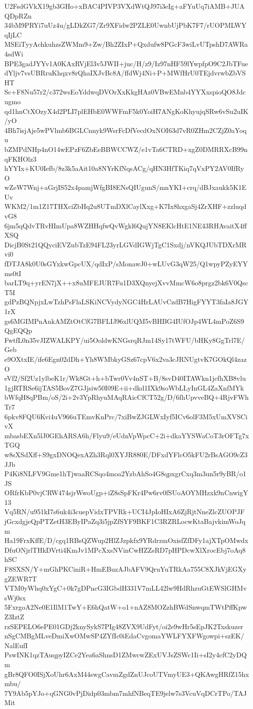 U2FsdGVkX19gb3GHo+xBAC4PIVP3VXdWtQJ97i3eIg+aFYuUq7iAMB+JUAQDpRZn
34bM9PRYi7uUz4u/gLDkZG7/Zr9XFidw2PZLE0UwnbUjPbK7F7/rUOPMLWYqIjLC
MSEiTyyAchkuhzsZWMm9+Zw/Bh2ZIxP+Qxdufw8PGcF3wiLvUTpshD7AWRa4sdWi
BPE3gadJYYv1A0KAxRVjEl3v5JWII+juc/H/z9/Iz97nHF59lYwpfpO9C2JbTFue
dYljv7vsUBRruKhqxv8rQhaIXJvBc8A/ffdWj4Ni+P+MWfHrU0TEjdvrwbZbVSHT
Sc+F8Nu57r2/c372wsEoYddwqDVOrXxKkgHAz0VBwEMnb4YYXxspioQO8Jdcugmo
qd1hnCtXOzyX4d2PLI7plEHbE0WWFmF5k0YoiH7ANgKoKhyujqSRw6vSu2uIK/yO
4Bh7isjAje5wPVlmb6BGLCnnyk9WsrFcDfVecdOxNOI63d7vR0ZHm2CZjZ0aYoqu
bZMPdNHp4nO14wEPzF6ZbEeBBWCCWZ/e1vTa6CTRD+xgZ0DMRRXcB99nqFKHOlz3
hYYIx+KU0Iefb/8z3k5aAit10a8NYrKfNqsACg/qHN3HfTKiq7qVxPY2AV0IfRyO
wZeW7Wnj+aGrjIS52x4pamjWfgBI8ENsQIUgunS/mnYKI+crq/dBJxaukk5K1EUv
WKM2/1m1Z17THXciZbHq2u8UTmDXlCaylXxg+K7Ix8hxgaSj4ZrXHF+zzluqdvG8
6jm5qQdvTRvHImUpa8WZHHqfwQvWgkl6QujYN8EKlcHtE1NE43RHAvaitX4ffXSQ
DicjB0St21QQyciEVZubTzE94FL23yrLGVdIGWjTgC1Sxdj/nVKQJUbTDXrMRvi0
fDTJA8k0U0sGYxkwGpcUX/qdIxP/sMonawJ0+wLUvG3qW25/Q1wpyPZyEYYms0tI
barLT9q+yrEN7jX++x8uMFEJUR7Fu1D3XQnyejXvvMmcW6o8prgz2bk6V0QscT5I
gdPzBQNpjxLwTzhPsFlaLSKiNCVydyNGC4HrLAUvCzdB7HigFYYT3faIa8JGY1rX
gs6MGIMPnAnkAMZtOtCfG7BFLIJ96xlUQM5vBHBG4IUfOJp4WL4mPoZ6S9QgEQQp
FwtfL0n35vJIZWALKPY/ui5OoldwKNGsrqRJm14Sy17tWFU/bHKy8GgTrl7E/Geb
e9OXtxIE/ife6Egn02dDh+Yh8WMbkyGSz67cpV6x2va3cJRNUgtvK7GOkQl4zazO
eVf2/Sf2Uz1ylbeK1r/Wk8Gt+h+bTwr0Vv4nST+B/8svD40ITAWkn1jcfhXB8vlu
1gjRTRSe6ijTAS5BovZ7GJjsiw50I09E+ii+dkd1IXk9soWbLLyInGL4ZaXnfMYk
bWfqH8qPBm/oS/2i+2v3YpRhyuMAqRAicCfCT52g/D/6fhUpvveBQ+4RjvFWhTr7
6pkv8FQU6Kvi4uV966uTEmvKnPrc/7xiBwZJGLWxIyf5ICv6olF3M5xUmXVSCivX
mbasbEXn5lJ0GEhARSA6h/Flyu9/eUdnVpWpcC+2i+dkaYYSWaCoT3rOFTg7xTGQ
w8sXSdXff+S9gxDNOQexAZh3Rql0XYJR880E/DFxdYFlcO5kFU2rBsAGO9cZ3JJb
P4Ki8NLFV9Gme1hTjwaaRCSqo4moa2YzbAhSo4G8qpxgrCxq3m3un5r9yBR/o1JS
ORfrKbP0vjCRW474sjrWwoUgp+iZ8sSpFKr4Pw6rv0fSUoAOYMHzxk9nCnwigY13
Vq5RN/u951kI7s6uk4i3cuepVidxTPVRk+UCI4JpIoHIxA6ZjRjtNneZlcZUOPJF
jGcxdgjeQpPTZetH3EByIPaZq3i5jpZfSYF9BKF1C3RZRLocwKtaBajvkimWoJqm
Ha19FrxKffE/D/cgq1RBsQZWup2HlZJzpkfx9YRdrzmOxisfZfDFy1ajXTpOMwdx
DfuONjrlTHkDVrti4KmJv1MPcXxsNVinCwHZZsRD7pHPDcwXlXrocEbj7oAq8hSC
F8SXSN/Y+mGhPKCiniR+HmEBuzAJbAFV9QruYuTRkAa755C8XJkVjEGXygZEWR7T
VTM0yWhq0xYgC+0k7gDPncG3IGbdH331V7mLL42lw9HdRhzuGtEWSlGHMvsWj0sx
5FxrgoA2Ne0E1IlM1TwY+E6hQatW+o1+nAZ8MOZzhBWdSnwqmTWtPffKpwZ3IztZ
rzSEPELO6ePE01GDj2knySykS7PIg48ZVX9UdFyt/oi2e9wHr5sEpJK2Txskuzer
nSgCMBgMLveDmiXwOMwSP4ZYfIc0iEdaCvgomaYWLFYXFWgowpi+szEK/NalEufI
PswINK1qzTAuqpyIZCe2Yea6aShnsD1ZMwcwZExUVJsZSWc1Ii+sI2y4cfC2yDQm
gBr8QFO0ISjXoUhr6AxM44swgCavmZgdZnUJcoUTVmyUE3+QKAwgHRfZ15hxmbu/
7Y9Ab5pYJo+qGNG0vPjDidp03mbm7mhfNBeqTE9jelw7s3VcuVqDCrTPo/TAJMit
